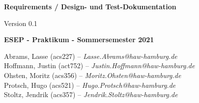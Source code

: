 \begin{titlepage}
    \begin{center}
            \begin{huge}
            \textbf{Requirements / Design- und Test-Dokumentation}
            \end{huge}
            
            \begin{large}
            \vspace{0.5cm}
            Version 0.1
            
            \vspace{0.5cm}
            
            \textbf{ESEP - Praktikum - Sommersemester 2021}
            \end{large}
            
            \vspace{0.5cm}
            
            \vfill
            
            Abrams, Lasse (acs227) -- \textit{Lasse.Abrams@haw-hamburg.de}\\
            Hoffmann, Justin (act752) -- \textit{Justin.Hoffmann@haw-hamburg.de}\\
            Ohsten, Moritz (acs356) -- \textit{Moritz.Ohsten@haw-hamburg.de}\\
            Protsch, Hugo (acs521) -- \textit{Hugo.Protsch@haw-hamburg.de}\\
            Stoltz, Jendrik (acs357) -- \textit{Jendrik.Stoltz@haw-hamburg.de}\\
        \end{center}
\end{titlepage}